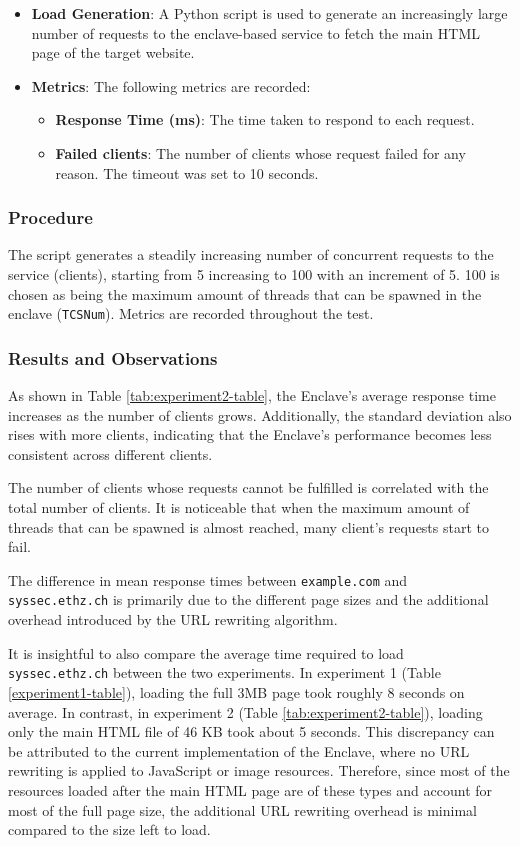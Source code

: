 \begin{itemize}
\begin{itemize}
    \end{itemize}
    \item \textbf{Load Generation}: A Python script is used to generate an increasingly large number of requests to the enclave-based service to fetch the main HTML page of the target website.
    \item \textbf{Metrics}: The following metrics are recorded:
    \begin{itemize}
        \item \textbf{Response Time (ms)}: The time taken to respond to each request.
        \item \textbf{Failed clients}: The number of clients whose request failed for any reason. The timeout was set to 10 seconds.
    \end{itemize}
\end{itemize}

\subsubsection{Procedure}
The script generates a steadily increasing number of concurrent requests to the service (clients), starting from 5 increasing to 100 with an increment of 5. 100 is chosen as being the maximum amount of threads that can be spawned in the enclave (\texttt{TCSNum}). Metrics are recorded throughout the test.

\subsubsection{Results and Observations}
As shown in Table \ref{tab:experiment2-table}, the Enclave's average response time increases as the number of clients grows. Additionally, the standard deviation also rises with more clients, indicating that the Enclave's performance becomes less consistent across different clients.

The number of clients whose requests cannot be fulfilled is correlated with the total number of clients. It is noticeable that when the maximum amount of threads that can be spawned is almost reached, many client's requests start to fail. 

The difference in mean response times between \texttt{example.com} and \\\texttt{syssec.ethz.ch} is primarily due to the different page sizes and the additional overhead introduced by the URL rewriting algorithm.

It is insightful to also compare the average time required to load \\\texttt{syssec.ethz.ch} between the two experiments. In experiment 1 (Table \ref{experiment1-table}), loading the full 3MB page took roughly 8 seconds on average. In contrast, in experiment 2 (Table \ref{tab:experiment2-table}), loading only the main HTML file of 46 KB took about 5 seconds. This discrepancy can be attributed to the current implementation of the Enclave, where no URL rewriting is applied to JavaScript or image resources. Therefore, since most of the resources loaded after the main HTML page are of these types and account for most of the full page size, the additional URL rewriting overhead is minimal compared to the size left to load.



